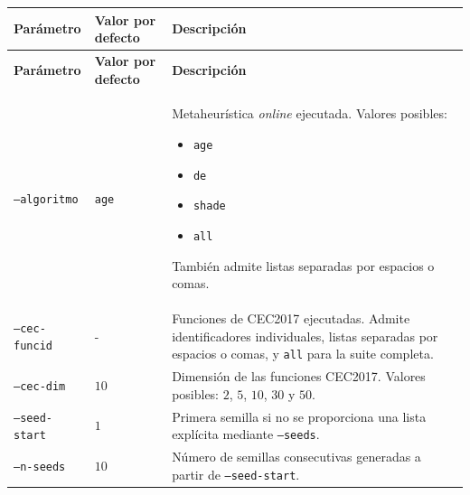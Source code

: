 \begin{longtable}[htbp]{|p{4.2cm}|p{2.3cm}|p{4.75cm}|}
    \hline
    \textbf{Parámetro} & \textbf{Valor por defecto}                                                     & \textbf{Descripción} \\
    \hline
    \endfirsthead

    \hline
    \textbf{Parámetro} & \textbf{Valor por defecto}                                                     & \textbf{Descripción} \\
    \hline
    \endhead

    \texttt{--algoritmo}
                       & \texttt{age}
                       & Metaheurística \textit{online} ejecutada. Valores posibles:
    \begin{itemize}
        \setlength{\itemsep}{0pt}
        \setlength{\topsep}{2pt}
        \item \texttt{age}
        \item \texttt{de}
        \item \texttt{shade}
        \item \texttt{all}
    \end{itemize}
    También admite listas separadas por espacios o comas.                                                                      \\
    \hline

    \texttt{--cec-funcid}
                       & -
                       & Funciones de CEC2017 ejecutadas. Admite identificadores individuales, listas
    separadas por espacios o comas, y \texttt{all} para la suite completa.                                                     \\
    \hline

    \texttt{--cec-dim}
                       & \(10\)
                       & Dimensión de las funciones CEC2017. Valores posibles: \(2\), \(5\), \(10\),
    \(30\) y \(50\).                                                                                                           \\
    \hline

    \texttt{--seed-start}
                       & \(1\)
                       & Primera semilla si no se proporciona una lista explícita mediante
    \texttt{--seeds}.                                                                                                          \\
    \hline

    \texttt{--n-seeds}
                       & \(10\)
                       & Número de semillas consecutivas generadas a partir de
    \texttt{--seed-start}.                                                                                                     \\
    \hline


\end{longtable}
